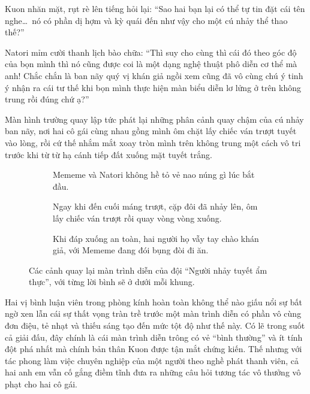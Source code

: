 \documentclass[../main.tex]{subfiles}
\begin{document}
Kuon nhăn mặt, rụt rè lên tiếng hỏi lại: ``Sao hai bạn lại có thể tự tin đặt cái tên nghe\dots\ nó có phần dị hợm và kỳ quái đến như vậy cho một cú nhảy thể thao thế?''

Natori mỉm cười thanh lịch bào chữa: ``Thì suy cho cùng thì cái đó theo góc độ của bọn mình thì nó cũng được coi là một dạng nghệ thuật phô diễn cơ thể mà anh! Chắc chắn là ban nãy quý vị khán giả ngồi xem cũng đã vô cùng chú ý tinh ý nhận ra cái tư thế khi bọn mình thực hiện màn biểu diễn lơ lửng ở trên không trung rồi đúng chứ ạ?''

Màn hình trường quay lập tức phát lại những phân cảnh quay chậm của cú nhảy ban nãy, nơi hai cô gái cùng nhau gồng mình ôm chặt lấy chiếc ván trượt tuyết vào lòng, rồi cứ thế nhắm mắt xoay tròn mình trên không trung một cách vô tri trước khi từ từ hạ cánh tiếp đất xuống mặt tuyết trắng.

\begin{figure}[H]
  \centering
  \begin{subfigure}[t]{0.45\textwidth}
    \centering
    \caption{Mememe và Natori không hề tỏ vẻ nao núng gì lúc bắt đầu.}
  \end{subfigure}
  \quad
  \begin{subfigure}[t]{0.45\textwidth}
    \centering
    \caption{Ngay khi đến cuối máng trượt, cặp đôi đã nhảy lên, ôm lấy chiếc ván trượt rồi quay vòng vòng xuống.}
  \end{subfigure}
  \quad
  \begin{subfigure}[t]{0.45\textwidth}
    \centering
    \caption{Khi đáp xuống an toàn, hai người họ vẫy tay chào khán giả, với Mememe đang đói bụng đòi đi ăn.}
  \end{subfigure}
  \caption{Các cảnh quay lại màn trình diễn của đội ``Người nhảy tuyết ẩm thực'', với từng lời bình sẽ ở dưới mỗi khung.}
\end{figure}

Hai vị bình luận viên trong phòng kính hoàn toàn không thể nào giấu nổi sự bất ngờ xen lẫn cái sự thất vọng tràn trề trước một màn trình diễn có phần vô cùng đơn điệu, tẻ nhạt và thiếu sáng tạo đến mức tột độ như thế này. Có lẽ trong suốt cả giải đấu, đây chính là cái màn trình diễn trông có vẻ ``bình thường'' và ít tính đột phá nhất mà chính bản thân Kuon được tận mắt chứng kiến. Thế nhưng với tác phong làm việc chuyên nghiệp của một người theo nghề phát thanh viên, cả hai anh em vẫn cố gắng điềm tĩnh đưa ra những câu hỏi tương tác vô thưởng vô phạt cho hai cô gái.
\end{document}
